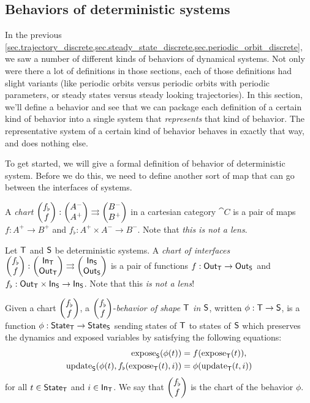 \documentclass[DynamicalBook]{subfiles}
\begin{document}
\subsection{Behaviors of deterministic systems}\label{sec.behaviors}

In the previous
\cref{sec.trajectory_discrete,sec.steady_state_discrete,sec.periodic_orbit_discrete},
we saw a number of different kinds of behaviors of dynamical systems. Not only
were there a lot of definitions in those sections, each of those definitions had
slight variants (like periodic orbits versus periodic orbits with periodic
parameters, or steady states versus steady looking trajectories). In this
section, we'll define a behavior and see that we can package each definition of a certain kind of
behavior into a single system that \emph{represents} that kind of
behavior. The representative system of a certain kind of behavior behaves in
exactly that way, and does nothing else.

To get started, we will give a formal definition of behavior of deterministic
system. Before we do this, we need to define another sort of map that can go
between the interfaces of systems.
\begin{definition}\label{def.chart_discrete}
  A \emph{chart} $\begin{pmatrix}{f_{\flat}} \\ {f} \end{pmatrix} : \begin{pmatrix}{A^-} \\ {A^+} \end{pmatrix} \rightrightarrows
  \begin{pmatrix}{B^-} \\ {B^+} \end{pmatrix}$ in a cartesian category $\cat{C}$ is a pair of maps $f : A^+ \to B^+$ and $f_{\flat} : A^+
  \times A^- \to B^-$. Note that \emph{this is not a lens}.

 
\end{definition}

\begin{definition} \label{def.behavior_discrete}
  Let $\mathsf{T}$ and $\mathsf{S}$ be deterministic systems. A \emph{chart
    of interfaces} $\begin{pmatrix}{f_{\flat}} \\ {f} \end{pmatrix} :
  \begin{pmatrix}{\mathsf{In}_{\mathsf{T}}} \\ {\mathsf{Out}_{\mathsf{T}}} \end{pmatrix} \rightrightarrows \begin{pmatrix}{\mathsf{In}_{\mathsf{S}}} \\ {\mathsf{Out}_{\mathsf{S}}} \end{pmatrix}$ is a pair of
  functions $f : \mathsf{Out}_{\mathsf{T}} \to \mathsf{Out}_{\mathsf{S}}$ and $f_{\flat} : \mathsf{Out}_{\mathsf{T}} \times \mathsf{In}_{\mathsf{S}} \to
  \mathsf{In}_{\mathsf{S}}$. Note that this \emph{is not a lens}!

  Given a chart $\begin{pmatrix}{f_{\flat}} \\ {f} \end{pmatrix}$, a $\begin{pmatrix}{f_{\flat}} \\ {f} \end{pmatrix}$-\emph{behavior of
  shape $\mathsf{T}$ in $\mathsf{S}$}, written
 $\phi :
\mathsf{T} \to \mathsf{S}$, is a function $\phi : \mathsf{State}_{\mathsf{T}} \to \mathsf{State}_{\mathsf{S}}$ sending
states of $\mathsf{T}$ to states of $\mathsf{S}$ which preserves the dynamics and
exposed variables by satisfying the following equations:
\begin{equation}\label{eqn.behavior_discrete}
\begin{aligned}
  \mathrm{expose}_{\mathsf{S}}(\phi(t)) &= f(\mathrm{expose}_{\mathsf{T}}(t)), \\
  \mathrm{update}_{\mathsf{S}}(\phi(t), f_{\flat}(\mathrm{expose}_{\mathsf{T}}(t), i)) &= \phi(\mathrm{update}_{\mathsf{T}}(t, i))
\end{aligned}
\end{equation}
for all $t \in \mathsf{State}_{\mathsf{T}}$ and $i \in \mathsf{In}_{\mathsf{T}}$. We say that $\begin{pmatrix}{f_{\flat}} \\ {f} \end{pmatrix}$
is the chart of the behavior $\phi$.
\end{definition}
\end{document}
